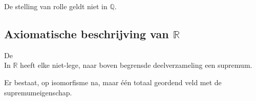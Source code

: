 \documentclass[main.tex]{subfiles}
\begin{document}
\begin{st}
  De stelling van rolle geldt niet in $\mathbb{Q}$.
\end{st}


\subsection{Axiomatische beschrijving van $\mathbb{R}$}
\label{sec:axiom-beschr-van}

\begin{st}
  \label{st:supremumeigenschap-R}
  De \\
  In $\mathbb{R}$ heeft elke niet-lege, naar boven begrensde deelverzameling een supremum.
\end{st}

\begin{st}
  Er bestaat, op isomorfisme na, maar \'e\'en totaal geordend veld met de supremumeigenschap.
\end{st}
\end{document}
